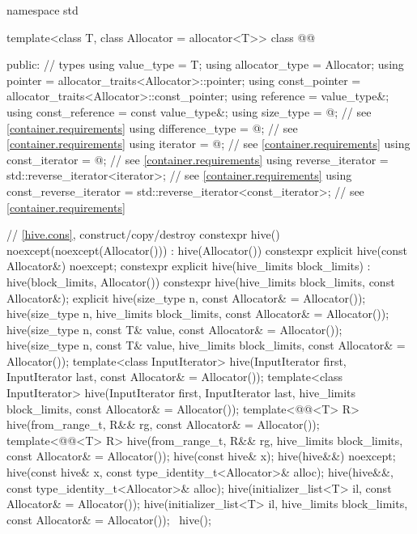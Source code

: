 \begin{codeblock}
namespace std {
  template<class T, class Allocator = allocator<T>>
  class @@ {
  public:
    // types
    using value_type = T;
    using allocator_type = Allocator;
    using pointer = allocator_traits<Allocator>::pointer;
    using const_pointer = allocator_traits<Allocator>::const_pointer;
    using reference = value_type&;
    using const_reference = const value_type&;
    using size_type = @\impdef@;                               // see \ref{container.requirements}
    using difference_type = @\impdef@;                         // see \ref{container.requirements}
    using iterator = @\impdef@;                                // see \ref{container.requirements}
    using const_iterator = @\impdef@;                          // see \ref{container.requirements}
    using reverse_iterator = std::reverse_iterator<iterator>;               // see \ref{container.requirements}
    using const_reverse_iterator = std::reverse_iterator<const_iterator>;   // see \ref{container.requirements}

    // \ref{hive.cons}, construct/copy/destroy
    constexpr hive() noexcept(noexcept(Allocator())) : hive(Allocator()) {}
    constexpr explicit hive(const Allocator&) noexcept;
    constexpr explicit hive(hive_limits block_limits) : hive(block_limits, Allocator()) {}
    constexpr hive(hive_limits block_limits, const Allocator&);
    explicit hive(size_type n, const Allocator& = Allocator());
    hive(size_type n, hive_limits block_limits, const Allocator& = Allocator());
    hive(size_type n, const T& value, const Allocator& = Allocator());
    hive(size_type n, const T& value, hive_limits block_limits, const Allocator& = Allocator());
    template<class InputIterator>
      hive(InputIterator first, InputIterator last, const Allocator& = Allocator());
    template<class InputIterator>
      hive(InputIterator first, InputIterator last, hive_limits block_limits,
           const Allocator& = Allocator());
    template<@@<T> R>
      hive(from_range_t, R&& rg, const Allocator& = Allocator());
    template<@@<T> R>
      hive(from_range_t, R&& rg, hive_limits block_limits, const Allocator& = Allocator());
    hive(const hive& x);
    hive(hive&&) noexcept;
    hive(const hive& x, const type_identity_t<Allocator>& alloc);
    hive(hive&&, const type_identity_t<Allocator>& alloc);
    hive(initializer_list<T> il, const Allocator& = Allocator());
    hive(initializer_list<T> il, hive_limits block_limits, const Allocator& = Allocator());
    ~hive();

}}
\end{codeblock}
